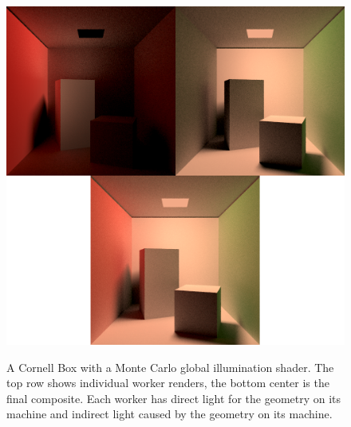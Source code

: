 \documentclass[12pt]{ucthesis}
\newcommand{\captionfonts}{\small\bf\ssp}
\begin{document}
\begin{figure}[h!]
    \centering
    \includegraphics[width=140mm]{showoff/gi.png}
    \captionfonts
    \caption{A Cornell Box with a Monte Carlo global illumination shader. The top row shows individual worker renders, the bottom center is the final composite. Each worker has direct light for the geometry on its machine and indirect light caused by the geometry on its machine.}
    \label{fig:sogi}
\end{figure}
\end{document}

